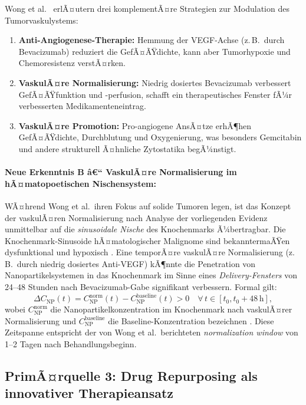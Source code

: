 ﻿\documentclass[12pt,a4paper]{article}
\theoremstyle{definition}
\begin{document}
Wong et al.\ \cite{wong2016} erlÃ¤utern drei komplementÃ¤re Strategien zur Modulation
des Tumorvaskulystems:
\begin{enumerate}
  \item \textbf{Anti-Angiogenese-Therapie:} Hemmung der VEGF-Achse (z.\,B.\ durch
        Bevacizumab) reduziert die GefÃ¤ÃŸdichte, kann aber Tumorhypoxie und
        Chemoresistenz verstÃ¤rken.
  \item \textbf{VaskulÃ¤re Normalisierung:} Niedrig dosiertes Bevacizumab verbessert
        GefÃ¤ÃŸfunktion und -perfusion, schafft ein therapeutisches Fenster fÃ¼r
        verbesserten Medikamenteneintrag.
  \item \textbf{VaskulÃ¤re Promotion:} Pro-angiogene AnsÃ¤tze erhÃ¶hen GefÃ¤ÃŸdichte,
        Durchblutung und Oxygenierung, was besonders Gemcitabin und andere
        strukturell Ã¤hnliche Zytostatika begÃ¼nstigt.
\end{enumerate}

\paragraph{Neue Erkenntnis B â€“ VaskulÃ¤re Normalisierung im hÃ¤matopoetischen Nischensystem:}
WÃ¤hrend Wong et al.\ ihren Fokus auf solide Tumoren legen, ist das Konzept der
vaskulÃ¤ren Normalisierung nach Analyse der vorliegenden Evidenz unmittelbar auf die
\emph{sinusoidale Nische} des Knochenmarks Ã¼bertragbar. Die Knochenmark-Sinusoide
hÃ¤matologischer Malignome sind bekanntermaÃŸen dysfunktional und hypoxisch
\cite{adeyemi2025}. Eine temporÃ¤re vaskulÃ¤re Normalisierung (z.\,B.\ durch niedrig
dosiertes Anti-VEGF) kÃ¶nnte die Penetration von Nanopartikelsystemen in das
Knochenmark im Sinne eines \emph{Delivery-Fensters} von 24--48 Stunden nach
Bevacizumab-Gabe signifikant verbessern. Formal gilt:
\begin{equation}
  \Delta C_{\mathrm{NP}}(t) = C_{\mathrm{NP}}^{\mathrm{norm}}(t)
                             - C_{\mathrm{NP}}^{\mathrm{baseline}}(t) > 0
  \quad \forall\, t \in [t_0, t_0 + 48\,\mathrm{h}],
  \label{eq:delivery_window}
\end{equation}
wobei $C_{\mathrm{NP}}^{\mathrm{norm}}$ die Nanopartikelkonzentration im Knochenmark
nach vaskulÃ¤rer Normalisierung und $C_{\mathrm{NP}}^{\mathrm{baseline}}$ die
Baseline-Konzentration bezeichnen \cite{wong2016}. Diese Zeitspanne entspricht der
von Wong et al.\ berichteten \emph{normalization window} von 1--2 Tagen nach
Behandlungsbeginn.

\subsection{PrimÃ¤rquelle 3: Drug Repurposing als innovativer Therapieansatz}
\label{subsec:mccabe}
\end{document}
